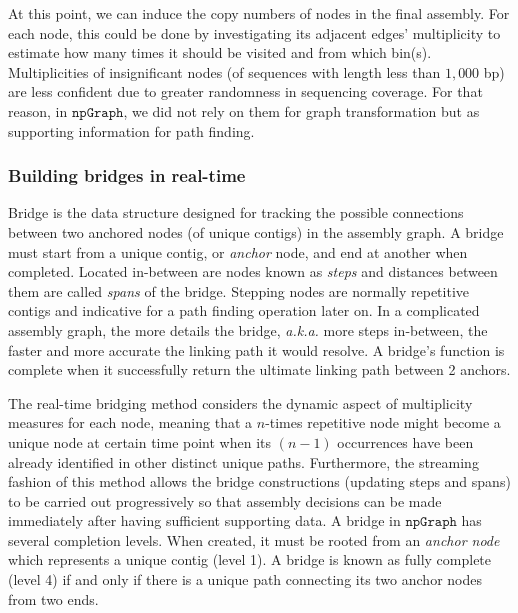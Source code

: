 \documentclass[10pt,letterpaper]{article}
\newcommand{\npgraph}{$\mathtt{npGraph}$}
\begin{document}
At this point, we can induce the copy numbers of nodes in the final assembly.
For each node, this could be done by investigating its adjacent edges' multiplicity to estimate how many times it should be visited and from which bin(s).
Multiplicities of insignificant nodes (of sequences with length less than $1,000$ bp) are less confident due to greater randomness in sequencing coverage. 
For that reason, in \npgraph{}, we did not rely on them for graph transformation but as supporting information for path finding.

\subsubsection*{Building bridges in real-time}
Bridge is the data structure designed for tracking the possible connections between two anchored nodes (of unique contigs) in the assembly graph.
A bridge must start from a unique contig, or \emph{anchor} node, and end at another when completed. Located in-between are nodes known as \emph{steps} and distances between them are called \emph{spans} of the bridge. Stepping nodes are normally repetitive contigs and indicative for a path finding operation later on. In a complicated assembly graph, the more details the bridge, \emph{a.k.a.} more steps in-between, the faster and more accurate the linking path it would resolve. A bridge's function is complete when it successfully return the ultimate linking path between 2 anchors.

The real-time bridging method considers the dynamic aspect of multiplicity measures for each node, meaning that a $n$-times repetitive node might become a unique node at certain time point when its $(n-1)$ occurrences have been already identified in other distinct unique paths. 
Furthermore, the streaming fashion of this method allows the bridge constructions (updating steps and spans) to be carried out progressively so that assembly decisions can be made immediately after having sufficient supporting data.
A bridge in \npgraph{} has several completion levels. When created, it must be rooted from an \emph{anchor node} which represents a unique contig (level 1). A bridge is known as fully complete (level 4) if and only if there is a unique path connecting its two anchor nodes from two ends. 
\end{document}
